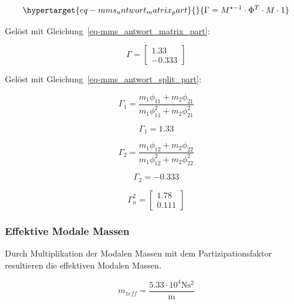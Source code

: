 \documentclass[
  letterpaper,
  DIV=11]{scrreprt}
\begin{document}
\begin{equation}\protect\hypertarget{eq-mms_antwort_matrix_part}{}{
\Gamma = M^{\star-1} \cdot \Phi^T \cdot M \cdot 1
}\label{eq-mms_antwort_matrix_part}\end{equation}

Gelöst mit Gleichung~\ref{eq-mms_antwort_matrix_part}:

\begin{equation}\Gamma = \left[\begin{matrix}1.33\\-0.333\end{matrix}\right]\end{equation}

Gelöst mit Gleichung~\ref{eq-mms_antwort_split_part}:

\begin{equation}\Gamma_{1} = \frac{m_{1} \phi_{11} + m_{2} \phi_{21}}{m_{1} \phi_{11}^{2} + m_{2} \phi_{21}^{2}}\end{equation}

\begin{equation}\Gamma_{1} = 1.33\end{equation}

\begin{equation}\Gamma_{2} = \frac{m_{1} \phi_{12} + m_{2} \phi_{22}}{m_{1} \phi_{12}^{2} + m_{2} \phi_{22}^{2}}\end{equation}

\begin{equation}\Gamma_{2} = -0.333\end{equation}

\begin{equation}\Gamma^{2}_{n} = \left[\begin{matrix}1.78\\0.111\end{matrix}\right]\end{equation}

\hypertarget{effektive-modale-massen}{%
\subsubsection{Effektive Modale Massen}\label{effektive-modale-massen}}

Durch Multiplikation der Modalen Massen mit dem Partizipationsfaktor
resultieren die effektiven Modalen Massen.

\begin{equation}m_{1eff} = \frac{5.33 \cdot 10^{4} \text{N} \text{s}^{2}}{\text{m}}\end{equation}
\end{document}
